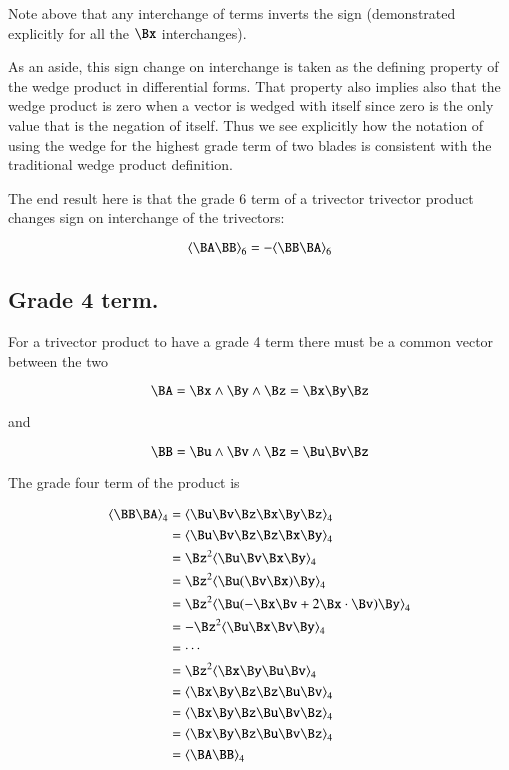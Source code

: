 \documentclass{article}      %
\newcommand{\gpgrade}[2] {{\left\langle{{#1}}\right\rangle}_{#2}}
\begin{document}
Note above that any interchange of terms inverts the sign (demonstrated 
explicitly for all the $\Bx$ interchanges).

As an aside, this
sign change on interchange is taken as the defining property of the 
wedge product in differential forms.  That property also
implies also that the wedge product is
zero when a vector is wedged with itself since zero is the only
value that is the negation of itself.  Thus we see explicitly
how the notation of using the wedge for the highest grade term
of two blades is consistent with the traditional
wedge product definition.

The end result here is that the grade 6 term of a trivector trivector product
changes sign on interchange of the trivectors:

\begin{equation}\label{eqn:trivecgpgrade6}
\gpgrade{\BA\BB}{6} = -\gpgrade{\BB\BA}{6}
\end{equation}

\subsection{ Grade 4 term. }

For a trivector product to have a grade 4 term there must be a common
vector between the two

\[
\BA = \Bx \wedge \By \wedge \Bz = \Bx\By\Bz
\]

and

\[
\BB = \Bu \wedge \Bv \wedge \Bz =\Bu\Bv\Bz
\]

The grade four term of the product is

\begin{align*}
\gpgrade{\BB \BA}{4}
&= \gpgrade{ \Bu\Bv\Bz \Bx\By\Bz }{4} \\
&= \gpgrade{ \Bu\Bv\Bz \Bz\Bx\By }{4} \\
&= \Bz^2\gpgrade{ \Bu\Bv\Bx\By }{4} \\
&= \Bz^2\gpgrade{ \Bu(\Bv\Bx)\By }{4} \\
&= \Bz^2\gpgrade{ \Bu(-\Bx\Bv + 2 \Bx \cdot \Bv)\By }{4} \\
&= -\Bz^2\gpgrade{ \Bu\Bx\Bv\By }{4} \\
&= \cdots \\
&= \Bz^2\gpgrade{ \Bx\By\Bu\Bv }{4} \\
&= \gpgrade{ \Bx\By\Bz\Bz\Bu\Bv }{4} \\
&= \gpgrade{ \Bx\By\Bz\Bu\Bv\Bz }{4} \\
&= \gpgrade{ \Bx\By\Bz\Bu\Bv\Bz }{4} \\
&= \gpgrade{\BA \BB}{4}
\end{align*}
\end{document}
